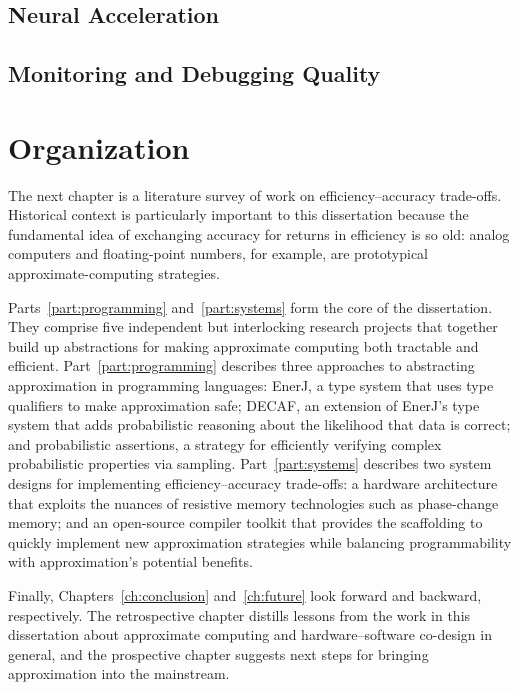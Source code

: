 \subsection{Neural Acceleration}

\cite{npu}
\cite{snnap}
\cite{anpu}

\subsection{Monitoring and Debugging Quality}

\cite{approxdebug}



\section{Organization}

The next chapter is a literature survey of work on efficiency--accuracy
trade-offs.
Historical context is particularly important to this dissertation because the
fundamental idea of exchanging accuracy for returns in efficiency is so old:
analog computers and floating-point numbers, for example, are prototypical
approximate-computing strategies.

Parts~\ref{part:programming} and~\ref{part:systems} form the core of the
dissertation.
They comprise five independent but interlocking research projects that
together build up abstractions for making approximate computing both tractable
and efficient.
%
Part~\ref{part:programming} describes three approaches to abstracting
approximation in programming languages:
EnerJ, a type system that uses type qualifiers to make approximation safe;
DECAF, an extension of EnerJ's type system that adds probabilistic reasoning
about the likelihood that data is correct;
and probabilistic assertions, a strategy for efficiently verifying complex
probabilistic properties via sampling.
%
Part~\ref{part:systems} describes two system designs for implementing
efficiency--accuracy trade-offs:
a hardware architecture that exploits the nuances of resistive memory
technologies such as phase-change memory;
and an open-source compiler toolkit that provides the scaffolding to quickly
implement new approximation strategies while balancing programmability with
approximation's potential benefits.

Finally, Chapters~\ref{ch:conclusion} and~\ref{ch:future} look forward and
backward, respectively.
The retrospective chapter distills lessons from the work in this dissertation
about approximate computing and hardware--software co-design in general, and
the prospective chapter suggests next steps for bringing approximation into
the mainstream.

